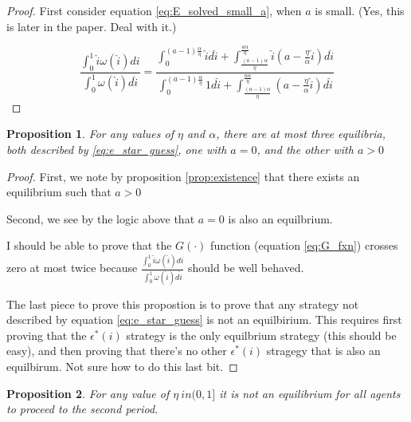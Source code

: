 \documentclass[WP]{AEA}
\newtheorem{prop}{Proposition}
\begin{document}
\begin{proof}
	First consider equation \ref{eq:E_solved_small_a}, when $a$ is small. (Yes, this is later in the paper. Deal with it.)
	
\begin{equation*}
\frac{\int_0^1 \hat{i} \omega(\hat{i}) di}{\int_0^1  \omega(\hat{i}) d\hat{i}} 
=  \frac{\int_0^{(a-1)\frac{\alpha}{\eta}}  \hat{i} d\hat{i} + 
	\int_{\frac{(a-1)\alpha}{\eta}}^{\frac{a\alpha}{\eta}}  \hat{i} (a - \frac{\eta}{\alpha}\hat{i}) d\hat{i} }{\int_0^{(a-1)\frac{\alpha}{\eta}} 1 d\hat{i} + 
	\int_{\frac{(a-1)\alpha}{\eta}}^{\frac{a\alpha}{\eta}}  (a - \frac{\eta}{\alpha}\hat{i}) d\hat{i} } 
\end{equation*}	 
	
\end{proof}
\begin{prop}
		For any values of $\eta$ and $\alpha$, there are at most three equilibria, both described by \ref{eq:e_star_guess}, one with $a = 0$, and the other with $a > 0$
\end{prop}
\begin{proof}
	First, we note by proposition \ref{prop:existence} that there exists an equilibrium such that $a > 0$
	
	Second, we see by the logic above that $a = 0$ is also an equilbrium.
	
	I should be able to prove that the $G(\cdot)$ function (equation \ref{eq:G_fxn}) crosses zero at most twice because $ \frac{\int_0^1 \hat{i} \omega(\hat{i}) di}{\int_0^1  \omega(\hat{i}) d\hat{i}}$ should be well behaved.
	
	The last piece to prove this propostion is to prove that any strategy not described by equation \ref{eq:e_star_guess} is not an equilbirium.  This requires first proving that the $\epsilon^*(i)$ strategy is the only equilbrium strategy (this should be easy), and then proving that there's no  other  $\epsilon^*(i)$ stragegy that is also an equilbirum. Not sure how to do this last bit.
	 
\end{proof}	

\begin{prop}
	For any value of $\eta \ in (0, 1]$ it is not an equilibrium for all agents to proceed to the second period. 
\end{prop}
\end{document}
